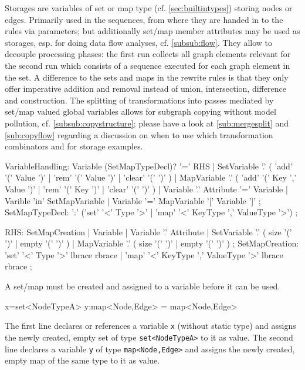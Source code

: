 Storages are variables of set or map type (cf. \ref{sec:builtintypes}) storing nodes or edges.
Primarily used in the sequences, from where they are handed in to the rules via parameters;
but additionally set/map member attributes may be used as storages,
esp. for doing data flow analyses, cf. \ref{subsub:flow}.
They allow to decouple processing phases: the first run collects all graph elements relevant for the second run which consists of a sequence executed for each graph element in the set.
A difference to the sets and maps in the rewrite rules is that they only offer imperative addition and removal instead of union, intersection, difference and construction.
The splitting of transformations into passes mediated by set/map valued global variables allows for subgraph copying without model pollution, cf. \ref{subsub:copystructure}; please have a look at \ref{sub:mergesplit} and \ref{sub:copyflow} regarding a discussion on when to use which transformation combinators and for storage examples.
 
\begin{rail}
  VariableHandling: 
    Variable (SetMapTypeDecl)? '=' RHS |
    SetVariable '.' ( 'add' '(' Value ')' | 'rem' '(' Value ')' | 'clear' '(' ')' ) |
    MapVariable '.' ( 'add' '(' Key ',' Value ')' | 'rem' '(' Key ')' | 'clear' '(' ')' ) |
	Variable '.' Attribute '=' Variable |
	Varible 'in' SetMapVariable |
	Variable '=' MapVariable '[' Variable ']'
    ;
  SetMapTypeDecl: 
    ':' ('set' '<' Type '>' | 'map' '<' KeyType ',' ValueType '>')
    ;
\end{rail}\makeatother

\begin{rail}
  RHS:
    SetMapCreation |
	Variable |
	Variable '.' Attribute |
    SetVariable '.' ( size '(' ')' | empty '(' ')' ) |
    MapVariable '.' ( size '(' ')' | empty '(' ')' )
    ;
  SetMapCreation:
	'set' '<' Type '>' lbrace rbrace |
    'map' '<' KeyType ',' ValueType '>' lbrace rbrace
	;
\end{rail}\makeatother

A set/map must be created and assigned to a variable before it can be used.

\begin{example}
\begin{grgen}
x=set<NodeTypeA>{}
y:map<Node,Edge> = map<Node,Edge>{}
\end{grgen}
The first line declares or references a variable \texttt{x} (without static type) and assigns the newly created, empty set of type \texttt{set<NodeTypeA>} to it as value.
The second line declares a variable \texttt{y} of type \texttt{map<Node,Edge>} and assigns the newly created, empty map of the same type to it as value.
\end{example}

